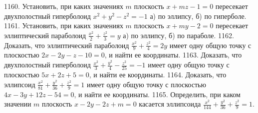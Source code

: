 1160. Установить, при каких значениях $m$ плоскость $x+m z-1=0$ пересекает двухполостный гиперболоид $x^2+y^2-z^2=-1$ а) по эллипсу, б) по гиперболе.
1161. Установить, при каких значениях $m$ плоскость $x+m y-2=0$ пересекает эллиптический параболоид $\frac{x^2}{2}+\frac{z^2}{3}=y$ а) по эллипсу, б) по параболе.
1162. Доказать, что эллиптический параболоид $\frac{x^2}{9}+\frac{z^2}{4}=2 y$ имеет одну общую точку с плоскостью $2 x-2 y-z-10=0$, и найти ее координаты.
1163. Доказать, что двухполостный гиперболоид $\frac{x^2}{3}+\frac{y^2}{4}-\frac{z^2}{25}=-1$ имеет одну общую точку с плоскостью $5 x+2 z+5=0$, и найти ее координаты.
1164. Доказать, что эллипсоид $\frac{x^2}{81}+\frac{y^2}{36}+\frac{z^2}{9}=1$ имеет одну общую точку с плоскостью $4 x-3 y+12 z-54=0$, и найти ее координаты.
1165. Определить, при каком значении $m$ плоскость $x-2 y-2 z+m=0$ касается эллипсоида $\frac{x^2}{144}+\frac{y^2}{36}+\frac{z^2}{9}=1$.